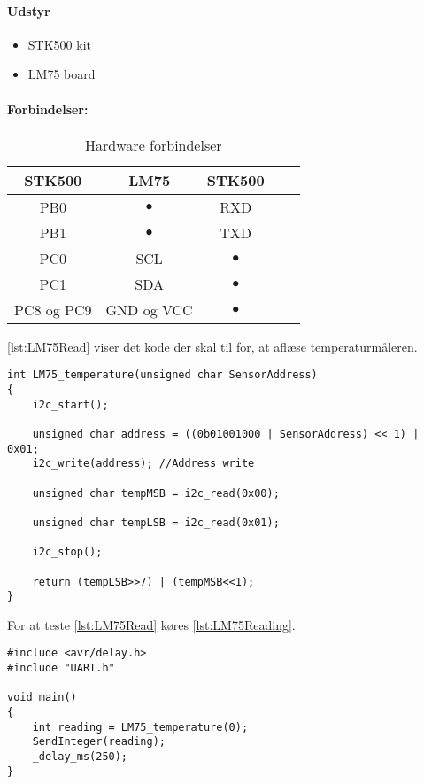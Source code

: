 \documentclass[Main]{subfiles}
\begin{document}
\paragraph{Udstyr}

\begin{itemize}
\item STK500 kit
\item LM75 board
\end{itemize}


\paragraph{Forbindelser:}

\begin{table}[H]
\centering
\begin{tabular}{c c c c c}
\hline 
STK500 & LM75 &  STK500 \\ 
\hline 
PB0 & $\bullet$ & RXD \\
PB1 & $\bullet$ & TXD \\ 
PC0 & SCL & $\bullet$ \\
PC1 & SDA & $\bullet$ \\
PC8 og PC9 & GND og VCC & $\bullet$ \\
\hline 
\end{tabular} 
\caption{Hardware forbindelser}
\label{tbl:oversigt}
\end{table}

\codeTitle \ref{lst:LM75Read} viser det kode der skal til for, at aflæse temperaturmåleren.

\begin{lstlisting}[caption=Funktion til læsning af LM75, style=Code-C, label=lst:LM75Read]
int LM75_temperature(unsigned char SensorAddress)
{
	i2c_start();
	
	unsigned char address = ((0b01001000 | SensorAddress) << 1) | 0x01;
	i2c_write(address); //Address write
	
	unsigned char tempMSB = i2c_read(0x00); 
	
	unsigned char tempLSB = i2c_read(0x01);
	
	i2c_stop();
	
	return (tempLSB>>7) | (tempMSB<<1);
}

\end{lstlisting}

For at teste \codeTitle \ref{lst:LM75Read} køres \codeTitle \ref{lst:LM75Reading}.

\begin{lstlisting}[caption=Funktion til læsning af LM75, style=Code-C, label=lst:LM75Reading]
#include <avr/delay.h>
#include "UART.h"

void main()
{
	int reading = LM75_temperature(0);
	SendInteger(reading);
	_delay_ms(250);
}
\end{lstlisting}
\end{document}
